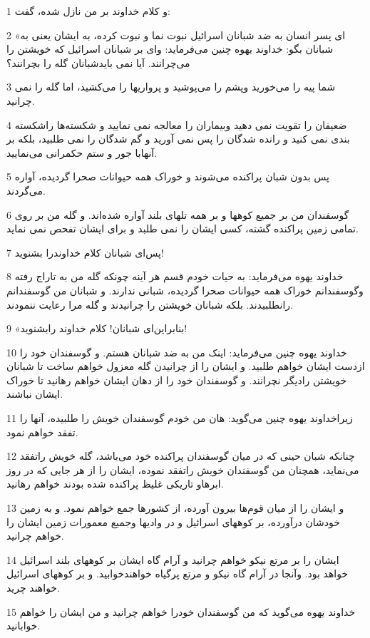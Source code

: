 \par 1 و کلام خداوند بر من نازل شده، گفت:
\par 2 «ای پسر انسان به ضد شبانان اسرائیل نبوت نما و نبوت کرده، به ایشان یعنی به شبانان بگو: خداوند یهوه چنین می‌فرماید: وای بر شبانان اسرائیل که خویشتن را می‌چرانند. آیا نمی بایدشبانان گله را بچرانند؟
\par 3 شما پیه را می‌خورید وپشم را می‌پوشید و پرواریها را می‌کشید، اما گله را نمی چرانید.
\par 4 ضعیفان را تقویت نمی دهید وبیماران را معالجه نمی نمایید و شکسته‌ها راشکسته بندی نمی کنید و رانده شدگان را پس نمی آورید و گم شدگان را نمی طلبید، بلکه بر آنهابا جور و ستم حکمرانی می‌نمایید.
\par 5 پس بدون شبان پراکنده می‌شوند و خوراک همه حیوانات صحرا گردیده، آواره می‌گردند.
\par 6 گوسفندان من بر جمیع کوهها و بر همه تلهای بلند آواره شده‌اند. و گله من بر روی تمامی زمین پراکنده گشته، کسی ایشان را نمی طلبد و برای ایشان تفحص نمی نماید.
\par 7 پس‌ای شبانان کلام خداوندرا بشنوید!
\par 8 خداوند یهوه می‌فرماید: به حیات خودم قسم هر آینه چونکه گله من به تاراج رفته وگوسفندانم خوراک همه حیوانات صحرا گردیده، شبانی ندارند. و شبانان من گوسفندانم رانطلبیدند. بلکه شبانان خویشتن را چرانیدند و گله مرا رعایت ننمودند.
\par 9 «بنابراین‌ای شبانان! کلام خداوند رابشنوید!
\par 10 خداوند یهوه چنین می‌فرماید: اینک من به ضد شبانان هستم. و گوسفندان خود را ازدست ایشان خواهم طلبید. و ایشان را از چرانیدن گله معزول خواهم ساخت تا شبانان خویشتن رادیگر نچرانند. و گوسفندان خود را از دهان ایشان خواهم رهانید تا خوراک ایشان نباشند.
\par 11 زیراخداوند یهوه چنین می‌گوید: هان من خودم گوسفندان خویش را طلبیده، آنها را تفقد خواهم نمود.
\par 12 چنانکه شبان حینی که در میان گوسفندان پراکنده خود می‌باشد، گله خویش راتفقد می‌نماید، همچنان من گوسفندان خویش راتفقد نموده، ایشان را از هر جایی که در روز ابرهاو تاریکی غلیظ پراکنده شده بودند خواهم رهانید.
\par 13 و ایشان را از میان قوم‌ها بیرون آورده، از کشورها جمع خواهم نمود. و به زمین خودشان درآورده، بر کوههای اسرائیل و در وادیها وجمیع معمورات زمین ایشان را خواهم چرانید.
\par 14 ایشان را بر مرتع نیکو خواهم چرانید و آرام گاه ایشان بر کوههای بلند اسرائیل خواهد بود. وآنجا در آرام گاه نیکو و مرتع پرگیاه خواهندخوابید. و بر کوههای اسرائیل خواهند چرید.
\par 15 خداوند یهوه می‌گوید که من گوسفندان خودرا خواهم چرانید و من ایشان را خواهم خوابانید.
